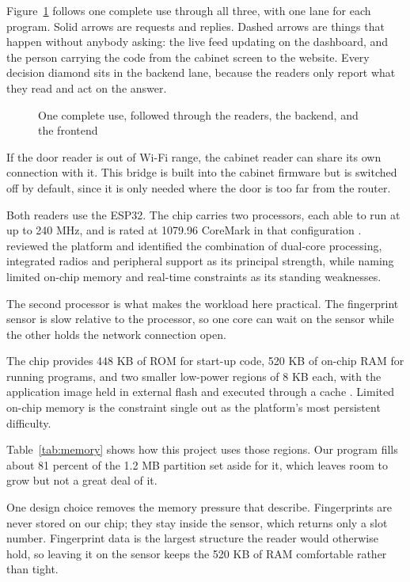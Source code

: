 Figure~\ref{fig:overall} follows one complete use through all three, with one
lane for each program. Solid arrows are requests and replies. Dashed arrows are
things that happen without anybody asking: the live feed updating on the
dashboard, and the person carrying the code from the cabinet screen to the
website. Every decision diamond sits in the backend lane, because the readers
only report what they read and act on the answer.

\begin{figure}[H]
\centering
\caption{One complete use, followed through the readers, the backend, and the
frontend}
\label{fig:overall}

\end{figure}

If the door reader is out of Wi-Fi range, the cabinet reader can share its own
connection with it. This bridge is built into the cabinet firmware but is
switched off by default, since it is only needed where the door is too far from
the router.


Both readers use the ESP32. The chip carries two processors, each able to run at
up to 240 MHz, and is rated at 1079.96 CoreMark in that configuration
\parencite{espressif2025}. \textcite{rahman2026} reviewed the platform and
identified the combination of dual-core processing, integrated radios and
peripheral support as its principal strength, while naming limited on-chip
memory and real-time constraints as its standing weaknesses.

The second processor is what makes the workload here practical. The fingerprint
sensor is slow relative to the processor, so one core can wait on the sensor
while the other holds the network connection open.


The chip provides 448 KB of ROM for start-up code, 520 KB of on-chip RAM for
running programs, and two smaller low-power regions of 8 KB each, with the
application image held in external flash and executed through a cache
\parencite{espressif2025}. Limited on-chip memory is the constraint
\textcite{rahman2026} single out as the platform's most persistent difficulty.

Table~\ref{tab:memory} shows how this project uses those regions. Our program
fills about 81 percent of the 1.2 MB partition set aside for it, which leaves
room to grow but not a great deal of it.

One design choice removes the memory pressure that \textcite{rahman2026}
describe. Fingerprints are never stored on our chip; they stay inside the
sensor, which returns only a slot number. Fingerprint data is the largest
structure the reader would otherwise hold, so leaving it on the sensor keeps the
520 KB of RAM \parencite{espressif2025} comfortable rather than tight.

